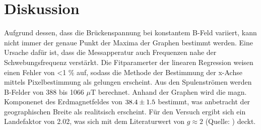 \section{Diskussion}
\label{sec:Diskussion}
Aufgrund dessen, dass die Brückenspannung bei konstantem B-Feld variiert, kann nicht immer der genaue Punkt der Maxima der Graphen bestimmt werden. Eine Ursache dafür ist, dass die Messapperatur auch Frequenzen nahe der Schwebungsfrequenz verstärkt. Die Fitparamerter der linearen Regression weisen einen Fehler von <1 \% auf, sodass die Methode der Bestimmung der x-Achse mittels Pixelbestimmung als gelungen erscheint. Aus den Spulenströmen werden B-Felder von 388 bis 1066 $\mu$T berechnet. Anhand der Graphen wird die magn. Komponenet des Erdmagnetfeldes von $\num{38.4 +- 1.5}$ bestimmt, was anbetracht der geographischen Breite als realitsisch erscheint. Für den Versuch ergibt sich ein Landefaktor von 2.02, was sich mit dem Literaturwert von $g \approx 2$ (Quelle: \cite{Lande}) deckt. 
